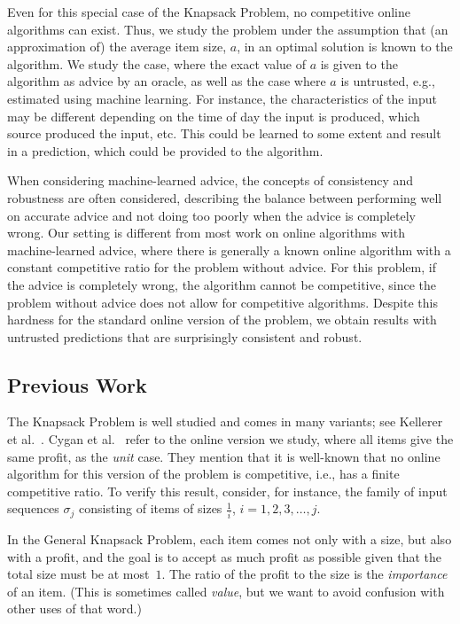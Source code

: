 \documentclass[a4paper,UKenglish,cleveref, autoref, thm-restate]{lipics-v2021}
\begin{document}
Even for this special case of the Knapsack Problem, no competitive
online algorithms can exist.  Thus, we study the problem under the
assumption that (an approximation of) the average item size, $a$, in
an optimal solution is known to the algorithm.  We study the case,
where the exact value of $a$ is given to the algorithm as advice by an
oracle, as well as the case where $a$ is untrusted, e.g., estimated using
machine learning. For instance, the characteristics of the input may
be different depending on the time of day the input is produced, which
source produced the input, etc. This could be learned to some extent
and result in a prediction, which could be provided to the algorithm.

When considering machine-learned advice, the
concepts of consistency and robustness are often considered,
describing the balance between performing well on accurate advice and
not doing too poorly when the advice is completely wrong.  Our setting
is different from most work on online algorithms with machine-learned
advice, where there is generally a known online algorithm with a
constant competitive ratio for the problem without advice. For this
problem, if the advice is completely wrong, the algorithm cannot be
competitive, since the problem without advice does not allow for
competitive algorithms. Despite this hardness for the standard online
version of the problem, we obtain results with untrusted predictions
that are surprisingly consistent and robust.

\subsection{Previous Work}
\label{previouswork}
The Knapsack Problem is well studied and comes in many variants; see
Kellerer et al.~\cite{KPP04}.  Cygan et al.~\cite{CJS16} refer to the
online version we study, where all items give the same profit, as the
\emph{unit} case.  They mention that it is well-known that no online
algorithm for this version of the problem is competitive, i.e., has a
finite competitive ratio.  To verify this result, consider, for
instance, the family of input sequences $\sigma_j$ consisting of items
of sizes $\frac1i$, $i=1,2,3,\ldots,j$.

In the General Knapsack Problem, each item comes not only with a size,
but also with a profit, and the goal is to accept as much profit as
possible given that the total size must be at most~$1$.  The ratio of
the profit to the size is the \emph{importance} of an item.  (This is
sometimes called \emph{value}, but we want to avoid confusion with
other uses of that word.)
\end{document}
